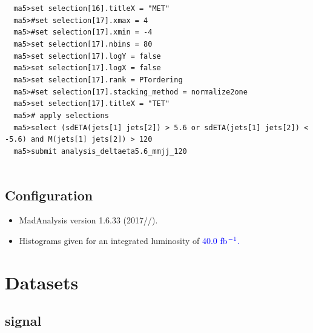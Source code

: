 \documentclass[a4paper, 10pt]{article}
\begin{document}
\texttt{ }\texttt{ }\texttt{ma5>set selection[16].titleX = "MET"\\
}
\texttt{ }\texttt{ }\texttt{ma5>\#set selection[17].xmax = 4\\
}
\texttt{ }\texttt{ }\texttt{ma5>\#set selection[17].xmin = -4\\
}
\texttt{ }\texttt{ }\texttt{ma5>set selection[17].nbins = 80\\
}
\texttt{ }\texttt{ }\texttt{ma5>set selection[17].logY = false\\
}
\texttt{ }\texttt{ }\texttt{ma5>set selection[17].logX = false\\
}
\texttt{ }\texttt{ }\texttt{ma5>set selection[17].rank = PTordering\\
}
\texttt{ }\texttt{ }\texttt{ma5>\#set selection[17].stacking\_method = normalize2one\\
}
\texttt{ }\texttt{ }\texttt{ma5>set selection[17].titleX = "TET"\\
}
\texttt{ }\texttt{ }\texttt{ma5>\# apply selections\\
}
\texttt{ }\texttt{ }\texttt{ma5>select (sdETA(jets[1] jets[2]) > 5.6 or sdETA(jets[1] jets[2]) < -5.6) and M(jets[1] jets[2]) > 120\\
}
\texttt{ }\texttt{ }\texttt{ma5>submit analysis\_deltaeta5.6\_mmjj\_120\\
}
\texttt{ }\texttt{ }\subsection{ Configuration}

\begin{itemize}
  \item MadAnalysis version 1.6.33 (2017//).
   \item Histograms given for an integrated luminosity of \textcolor{blue}{40.0}\textcolor{blue}{ fb}$^{\textcolor{blue}{-1}}$\textcolor{blue}{.}
\textcolor{blue}{}
\end{itemize}
\newpage
\section{ Datasets}

\subsection{ signal}
\end{document}
